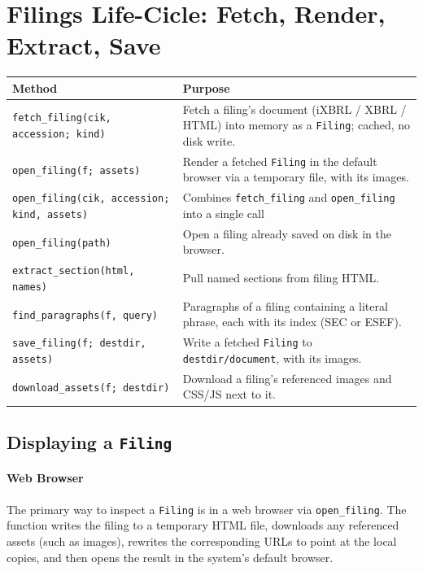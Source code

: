 \documentclass[11pt,a4paper]{report}
\begin{document}
\section{Filings Life-Cicle: Fetch, Render, Extract, Save}
\label{sec:api-filings}

\begin{longtable}{@{}p{}p{}@{}}
\toprule
\textbf{Method} & \textbf{Purpose} \\
\midrule
\endhead
\texttt{fetch\_filing(cik, accession; kind)} & Fetch a filing's document (iXBRL /
  XBRL / HTML) into memory as a \texttt{Filing}; cached, no disk write. \\
\texttt{open\_filing(f; assets)} & Render a fetched \texttt{Filing} in the default browser via a temporary file, with its images. \\
\texttt{open\_filing(cik, accession; kind, assets)} & Combines \texttt{fetch\_filing} and \texttt{open\_filing} into a single call\\
\texttt{open\_filing(path)} & Open a filing already saved on disk in the browser. \\
\texttt{extract\_section(html, names)} & Pull named sections from filing HTML. \\
\texttt{find\_paragraphs(f, query)} & Paragraphs of a filing containing a literal phrase, each with its index (SEC or ESEF). \\
\texttt{save\_filing(f; destdir, assets)} & Write a fetched \texttt{Filing} to \texttt{destdir/document}, with its images. \\
\midrule
\texttt{download\_assets(f; destdir)} & Download a filing's referenced images and CSS/JS next to it. \\
\bottomrule
\end{longtable}

\subsection{Displaying a \texttt{Filing}}
\label{sec:display-filing}

\paragraph{Web Browser}
The primary way to inspect a \texttt{Filing} is in a web browser via
\texttt{open\_filing}. The function writes the filing to a temporary HTML file,
downloads any referenced assets (such as images), rewrites the corresponding URLs
to point at the local copies, and then opens the result in the system's default
browser.
\end{document}
